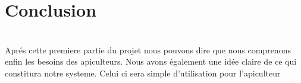 \chapter{Conclusion}\\
Aprés cette premiere partie du projet nous pouvons dire que nous comprenons enfin les besoins des apiculteurs. Nous avons également une idée claire de ce qui constitura notre systeme. Celui ci sera simple d'utilisation pour l'apiculteur 
